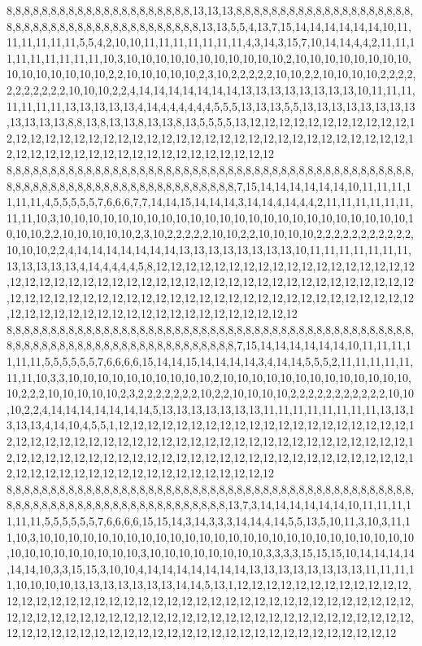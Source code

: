 8,8,8,8,8,8,8,8,8,8,8,8,8,8,8,8,8,8,8,8,8,13,13,13,8,8,8,8,8,8,8,8,8,8,8,8,8,8,8,8,8,8,8,8,8,8,8,8,8,8,8,8,8,8,8,8,8,8,8,8,8,8,8,8,8,8,13,13,5,5,4,13,7,15,14,14,14,14,14,14,10,11,11,11,11,11,11,5,5,4,2,10,10,11,11,11,11,11,11,11,4,3,14,3,15,7,10,14,14,4,4,2,11,11,11,11,11,11,11,11,11,10,3,10,10,10,10,10,10,10,10,10,10,10,2,10,10,10,10,10,10,10,10,10,10,10,10,10,10,10,2,2,10,10,10,10,10,2,3,10,2,2,2,2,2,10,10,2,2,10,10,10,10,2,2,2,2,2,2,2,2,2,2,2,10,10,10,2,2,4,14,14,14,14,14,14,14,13,13,13,13,13,13,13,13,10,11,11,11,11,11,11,11,13,13,13,13,13,4,14,4,4,4,4,4,4,5,5,5,13,13,13,5,5,13,13,13,13,13,13,13,13,13,13,13,13,8,8,13,8,13,13,8,13,13,8,13,5,5,5,5,13,12,12,12,12,12,12,12,12,12,12,12,12,12,12,12,12,12,12,12,12,12,12,12,12,12,12,12,12,12,12,12,12,12,12,12,12,12,12,12,12,12,12,12,12,12,12,12,12,12,12,12,12,12,12,12,12,12,12
8,8,8,8,8,8,8,8,8,8,8,8,8,8,8,8,8,8,8,8,8,8,8,8,8,8,8,8,8,8,8,8,8,8,8,8,8,8,8,8,8,8,8,8,8,8,8,8,8,8,8,8,8,8,8,8,8,8,8,8,8,8,8,8,8,8,8,8,8,8,8,8,7,15,14,14,14,14,14,14,10,11,11,11,11,11,11,4,5,5,5,5,5,7,6,6,6,7,7,14,14,15,14,14,14,3,14,14,4,14,4,4,2,11,11,11,11,11,11,11,11,10,3,10,10,10,10,10,10,10,10,10,10,10,10,10,10,10,10,10,10,10,10,10,10,10,10,10,10,10,2,2,10,10,10,10,10,2,3,10,2,2,2,2,2,10,10,2,2,10,10,10,10,2,2,2,2,2,2,2,2,2,2,2,10,10,10,2,2,4,14,14,14,14,14,14,14,13,13,13,13,13,13,13,13,10,11,11,11,11,11,11,11,13,13,13,13,13,4,14,4,4,4,4,5,8,12,12,12,12,12,12,12,12,12,12,12,12,12,12,12,12,12,12,12,12,12,12,12,12,12,12,12,12,12,12,12,12,12,12,12,12,12,12,12,12,12,12,12,12,12,12,12,12,12,12,12,12,12,12,12,12,12,12,12,12,12,12,12,12,12,12,12,12,12,12,12,12,12,12,12,12,12,12,12,12,12,12,12,12,12,12,12,12,12,12,12,12,12,12
8,8,8,8,8,8,8,8,8,8,8,8,8,8,8,8,8,8,8,8,8,8,8,8,8,8,8,8,8,8,8,8,8,8,8,8,8,8,8,8,8,8,8,8,8,8,8,8,8,8,8,8,8,8,8,8,8,8,8,8,8,8,8,8,8,8,8,8,8,8,8,8,7,15,14,14,14,14,14,14,10,11,11,11,11,11,11,5,5,5,5,5,5,7,6,6,6,6,15,14,14,15,14,14,14,14,3,4,14,14,5,5,5,2,11,11,11,11,11,11,11,10,3,3,10,10,10,10,10,10,10,10,10,10,2,10,10,10,10,10,10,10,10,10,10,10,10,10,10,2,2,2,10,10,10,10,10,2,3,2,2,2,2,2,2,2,10,2,2,10,10,10,10,2,2,2,2,2,2,2,2,2,2,2,10,10,10,2,2,4,14,14,14,14,14,14,14,5,13,13,13,13,13,13,13,11,11,11,11,11,11,11,11,13,13,13,13,13,4,14,10,4,5,5,1,12,12,12,12,12,12,12,12,12,12,12,12,12,12,12,12,12,12,12,12,12,12,12,12,12,12,12,12,12,12,12,12,12,12,12,12,12,12,12,12,12,12,12,12,12,12,12,12,12,12,12,12,12,12,12,12,12,12,12,12,12,12,12,12,12,12,12,12,12,12,12,12,12,12,12,12,12,12,12,12,12,12,12,12,12,12,12,12,12,12,12,12,12,12,12
8,8,8,8,8,8,8,8,8,8,8,8,8,8,8,8,8,8,8,8,8,8,8,8,8,8,8,8,8,8,8,8,8,8,8,8,8,8,8,8,8,8,8,8,8,8,8,8,8,8,8,8,8,8,8,8,8,8,8,8,8,8,8,8,8,8,8,8,8,8,8,13,7,3,14,14,14,14,14,14,10,11,11,11,11,11,11,5,5,5,5,5,5,7,6,6,6,6,15,15,14,3,14,3,3,3,14,14,4,14,5,5,13,5,10,11,3,10,3,11,11,10,3,10,10,10,10,10,10,10,10,10,10,10,10,10,10,10,10,10,10,10,10,10,10,10,10,10,10,10,10,10,10,10,10,10,10,10,3,10,10,10,10,10,10,10,10,3,3,3,3,15,15,15,10,14,14,14,14,14,14,10,3,3,15,15,3,10,10,4,14,14,14,14,14,14,14,13,13,13,13,13,13,13,13,11,11,11,11,10,10,10,10,13,13,13,13,13,13,13,14,14,5,13,1,12,12,12,12,12,12,12,12,12,12,12,12,12,12,12,12,12,12,12,12,12,12,12,12,12,12,12,12,12,12,12,12,12,12,12,12,12,12,12,12,12,12,12,12,12,12,12,12,12,12,12,12,12,12,12,12,12,12,12,12,12,12,12,12,12,12,12,12,12,12,12,12,12,12,12,12,12,12,12,12,12,12,12,12,12,12,12,12,12,12,12,12,12,12,12
